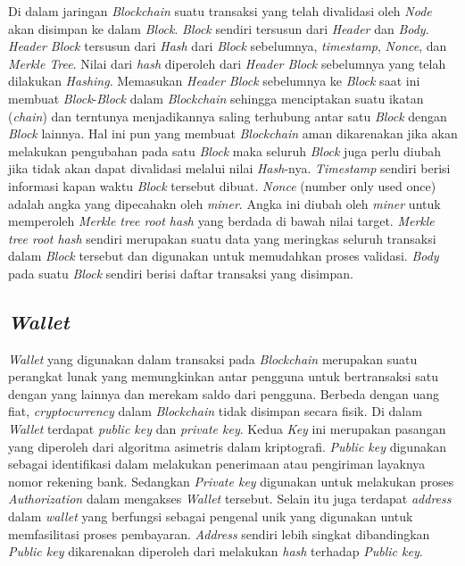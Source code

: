 Di dalam jaringan \emph{Blockchain} suatu transaksi yang telah divalidasi oleh \emph{Node} akan disimpan ke dalam \emph{Block}. \emph{Block} sendiri tersusun dari \emph{Header} dan \emph{Body}. \emph{Header Block} tersusun dari \emph{Hash} dari \emph{Block} sebelumnya, \emph{timestamp}, \emph{Nonce}, dan \emph{Merkle Tree}. Nilai dari \emph{hash} diperoleh dari \emph{Header Block} sebelumnya yang telah dilakukan \emph{Hashing}. Memasukan \emph{Header Block} sebelumnya ke \emph{Block} saat ini membuat \emph{Block}-\emph{Block} dalam \emph{Blockchain} sehingga menciptakan suatu ikatan (\emph{chain}) dan terntunya menjadikannya saling terhubung antar satu \emph{Block} dengan \emph{Block} lainnya. Hal ini pun yang membuat \emph{Blockchain} aman dikarenakan jika akan melakukan pengubahan pada satu \emph{Block} maka seluruh \emph{Block} juga perlu diubah jika tidak akan dapat divalidasi melalui nilai \emph{Hash}-nya. \emph{Timestamp} sendiri berisi informasi kapan waktu \emph{Block} tersebut dibuat. \emph{Nonce} (number only used once) adalah angka yang dipecahakn oleh \emph{miner}. Angka ini diubah oleh \emph{miner} untuk memperoleh \emph{Merkle tree root hash} yang berdada di bawah nilai target. \emph{Merkle tree root hash} sendiri merupakan suatu data yang meringkas seluruh transaksi dalam \emph{Block} tersebut dan digunakan untuk memudahkan proses validasi. \emph{Body} pada suatu \emph{Block} sendiri berisi daftar transaksi yang disimpan.     
\parencite{LiangYiangBlockchainDynamicSpectrum}

\subsection{\emph{Wallet}}

\emph{Wallet} yang digunakan dalam transaksi pada \emph{Blockchain} merupakan suatu perangkat lunak yang memungkinkan antar pengguna untuk bertransaksi satu dengan yang lainnya dan merekam saldo dari pengguna. Berbeda dengan uang fiat, \emph{cryptocurrency} dalam \emph{Blockchain} tidak disimpan secara fisik. Di dalam \emph{Wallet} terdapat \emph{public key} dan \emph{private key}. Kedua \emph{Key} ini merupakan pasangan yang diperoleh dari algoritma asimetris dalam kriptografi. \emph{Public key} digunakan sebagai identifikasi dalam melakukan penerimaan atau pengiriman layaknya nomor rekening bank. Sedangkan \emph{Private key} digunakan untuk melakukan proses \emph{Authorization} dalam mengakses \emph{Wallet} tersebut. Selain itu juga terdapat \emph{address} dalam \emph{wallet} yang berfungsi sebagai pengenal unik yang digunakan untuk memfasilitasi proses pembayaran. \emph{Address} sendiri lebih singkat dibandingkan \emph{Public key} dikarenakan diperoleh dari melakukan \emph{hash} terhadap \emph{Public key}. 
\parencite{JokicStevo}

